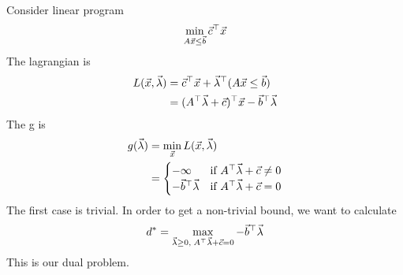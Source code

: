 \begin{example}
	Consider linear program
	\[
\min_{A\vec{x}\le \vec{b}} \vec{c}^\top\vec{x}
	\]
	The lagrangian is
	\begin{align*}
		L(\vec{x},\vec{\lambda}) &= \vec{c}^\top\vec{x}+\vec{\lambda}^\top(A\vec{x}\le \vec{b})\\
		&= (A^\top\vec{\lambda}+\vec{c})^\top\vec{x}-\vec{b}^\top\vec{\lambda}
	\end{align*}
	The g is 
	\begin{align*}
		g(\vec{\lambda}) &= \min_{\vec{x}}L(\vec{x},\vec{\lambda})\\
		&= \begin{cases}
			-\infty & \text{if } A^\top\vec{\lambda}+\vec{c}\neq 0\\
			-\vec{b}^\top\vec{\lambda} & \text{if } A^\top\vec{\lambda}+\vec{c}= 0
		\end{cases}
	\end{align*}
	The first case is trivial. In order to get a non-trivial bound, we want to calculate
	\[
d^* = \max_{\vec{\lambda}\ge0,\;A^\top\vec{\lambda}+\vec{c}=0} -\vec{b}^\top\vec{\lambda}
	\]
	This is our dual problem.

\end{example}

